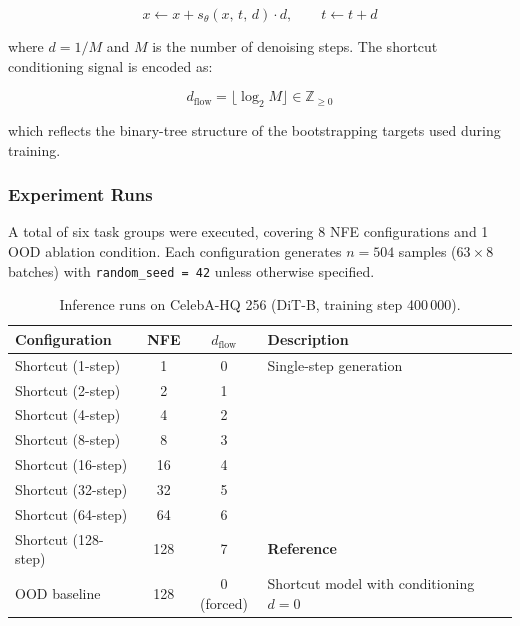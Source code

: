 \begin{equation}
    x \leftarrow x + s_\theta(x,\, t,\, d)\cdot d, \qquad
    t \leftarrow t + d
    \label{eq:euler}
\end{equation}

\noindent where $d = 1/M$ and $M$ is the number of denoising steps.
The shortcut conditioning signal is encoded as:

\begin{equation}
    d_{\mathrm{flow}} = \lfloor \log_2 M \rfloor \in \mathbb{Z}_{\geq 0}
    \label{eq:dtflow}
\end{equation}

\noindent which reflects the binary-tree structure of the bootstrapping targets
used during training.

\subsubsection{Experiment Runs}

A total of six task groups were executed, covering 8 NFE configurations and
1 OOD ablation condition.
Each configuration generates $n = 504$ samples ($63 \times 8$ batches)
with \texttt{random\_seed = 42} unless otherwise specified.

\begin{table}[h]
\centering
\caption{Inference runs on CelebA-HQ 256 (DiT-B, training step 400\,000).}
\label{tab:runs}
\begin{tabular}{lccl}
\toprule
\textbf{Configuration} & \textbf{NFE} & $d_{\mathrm{flow}}$ & \textbf{Description} \\
\midrule
Shortcut (1-step)   & 1   & 0 & Single-step generation \\
Shortcut (2-step)   & 2   & 1 & \\
Shortcut (4-step)   & 4   & 2 & \\
Shortcut (8-step)   & 8   & 3 & \\
Shortcut (16-step)  & 16  & 4 & \\
Shortcut (32-step)  & 32  & 5 & \\
Shortcut (64-step)  & 64  & 6 & \\
Shortcut (128-step) & 128 & 7 & \textbf{Reference} \\
OOD baseline        & 128 & 0 (forced) & Shortcut model with conditioning $d=0$ \\
\bottomrule
\end{tabular}
\end{table}

